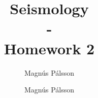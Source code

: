 \documentclass{article}
\date{}
\author{Magnús Pálsson}
\title{Seismology \\ - \\ \large Homework 2}
\author{Magnús Pálsson}
\begin{document}
\maketitle


\pagebreak

\pagebreak

\pagebreak

\end{document}
